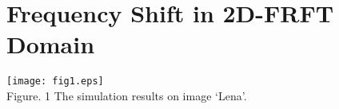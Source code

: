 \documentclass[journal]{IEEEtran}
\begin{document}
\section{Frequency Shift in 2D-FRFT Domain}
\begin{figure*}[t]
\centering
\texttt{[image: fig1.eps]}\\ Figure. 1 The simulation results on image `Lena'.\\
\end{figure*}
\end{document}
